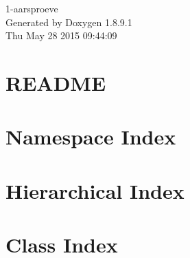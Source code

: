 \documentclass[twoside]{book}
\newcommand{\+}{\discretionary{\mbox{\scriptsize$\hookleftarrow$}}{}{}}
\newcommand{\clearemptydoublepage}{%
  \newpage{\pagestyle{empty}\cleardoublepage}%
}
\begin{document}
\hypersetup{pageanchor=false,
             bookmarks=true,
             bookmarksnumbered=true,
             pdfencoding=unicode
            }
\begin{titlepage}
\vspace*{7cm}
\begin{center}%
{\Large 1-\/aarsproeve }\\
\vspace*{1cm}
{\large Generated by Doxygen 1.8.9.1}\\
\vspace*{0.5cm}
{\small Thu May 28 2015 09:44:09}\\
\end{center}
\end{titlepage}
\clearemptydoublepage
\tableofcontents
\clearemptydoublepage
{}
\hypersetup{pageanchor=true}

\chapter{R\+E\+A\+D\+M\+E}
\label{md__documents__git_hub_1-aarsproeve__r_e_a_d_m_e}
\hypertarget{md__documents__git_hub_1-aarsproeve__r_e_a_d_m_e}{}

\chapter{Namespace Index}

\chapter{Hierarchical Index}

\chapter{Class Index}

\end{document}
